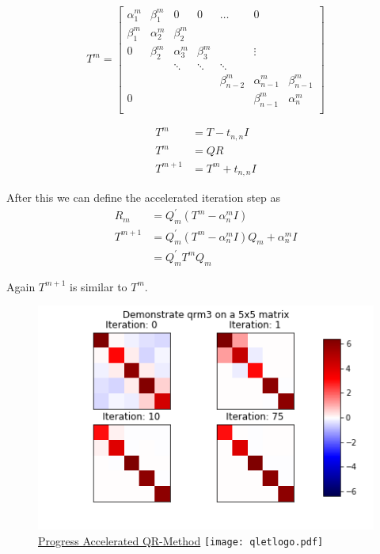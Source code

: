\documentclass[12pt]{article}
\begin{document}
\begin{equation}
\label{qrm3-prop}
T^{m} = \begin{bmatrix}

\alpha^{m}_1 & \beta^{m}_1  & 0            & 0            & \dots            & 0                                  \\
\beta^{m}_1  & \alpha^{m}_2 & \beta^{m}_2                                                                         \\
0            & \beta^{m}_2  & \alpha^{m}_3 & \beta^{m}_3  &                  & \vdots                             \\
             &              & \ddots       & \ddots       & \ddots                                                \\
             &              &              &              & \beta^{m}_{n-2}  & \alpha^{m}_{n-1} & \beta^{m}_{n-1} \\
0            &              &              &              &                  & \beta^{m}_{n-1}  & \alpha^{m}_n    \\

\end{bmatrix}
\end{equation}


\begin{align*}
T^{m}       &= T - t _{n, n} I \\
T^{m}       &= QR \\
T^{m+1}     &= T^{m} + t _{n, n} I
\end{align*}

After this we can define the accelerated iteration step as
\begin{align}
\label{qrm3}
R_m &= Q^{\prime}_m\left(T^m - \alpha_n^{m}I\right) \\
T^{m+1} &= Q^{\prime}_m\left(T^m - \alpha_n^{m}I\right)Q_m + \alpha_n^{m}I \\
        &= Q^{\prime}_m T^m Q_m
\end{align}

Again $T^{m+1}$ is similar to $T^m$.

\begin{figure}[H]
\centering
\caption{\href {https://github.com/thsis/NIS18/tree/master/media/plots}{Progress Accelerated QR-Method}  \protect\texttt{[image: qletlogo.pdf]}}
  \label{qr3-plot}
  \includegraphics[scale=0.6]{../media/plots/qrm3.png}
\end{figure}
\end{document}
